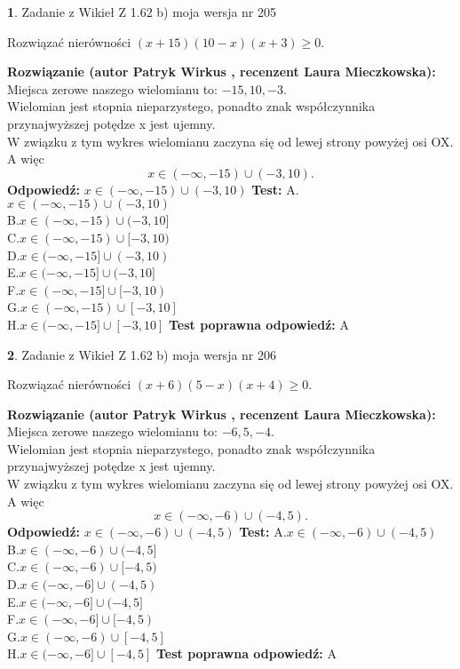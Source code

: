 \documentclass[12pt, a4paper]{article}
\theoremstyle{definition} %
\newtheorem{zad}{}
\newcommand{\zadStart}[1]{\begin{zad}#1\newline}
\newcommand{\zadStop}{\end{zad}}
\newcommand{\rozwStart}[2]{\noindent \textbf{Rozwiązanie (autor #1 , recenzent #2): }\newline}
\newcommand{\rozwStop}{\newline}
\newcommand{\odpStart}{\noindent \textbf{Odpowiedź:}\newline}
\newcommand{\odpStop}{\newline}
\newcommand{\testStart}{\noindent \textbf{Test:}\newline}
\newcommand{\testStop}{\newline}
\newcommand{\kluczStart}{\noindent \textbf{Test poprawna odpowiedź:}\newline}
\newcommand{\kluczStop}{\newline}
\begin{document}
\zadStart{Zadanie z Wikieł Z 1.62 b) moja wersja nr 205}

Rozwiązać nierówności $(x+15)(10-x)(x+3)\ge0$.
\zadStop
\rozwStart{Patryk Wirkus}{Laura Mieczkowska}
Miejsca zerowe naszego wielomianu to: $-15, 10, -3$.\\
Wielomian jest stopnia nieparzystego, ponadto znak współczynnika przy\linebreak najwyższej potędze x jest ujemny.\\ W związku z tym wykres wielomianu zaczyna się od lewej strony powyżej osi OX. A więc $$x \in (-\infty,-15) \cup (-3,10).$$
\rozwStop
\odpStart
$x \in (-\infty,-15) \cup (-3,10)$
\odpStop
\testStart
A.$x \in (-\infty,-15) \cup (-3,10)$\\
B.$x \in (-\infty,-15) \cup (-3,10]$\\
C.$x \in (-\infty,-15) \cup [-3,10)$\\
D.$x \in (-\infty,-15] \cup (-3,10)$\\
E.$x \in (-\infty,-15] \cup (-3,10]$\\
F.$x \in (-\infty,-15] \cup [-3,10)$\\
G.$x \in (-\infty,-15) \cup [-3,10]$\\
H.$x \in (-\infty,-15] \cup [-3,10]$
\testStop
\kluczStart
A
\kluczStop



\zadStart{Zadanie z Wikieł Z 1.62 b) moja wersja nr 206}

Rozwiązać nierówności $(x+6)(5-x)(x+4)\ge0$.
\zadStop
\rozwStart{Patryk Wirkus}{Laura Mieczkowska}
Miejsca zerowe naszego wielomianu to: $-6, 5, -4$.\\
Wielomian jest stopnia nieparzystego, ponadto znak współczynnika przy\linebreak najwyższej potędze x jest ujemny.\\ W związku z tym wykres wielomianu zaczyna się od lewej strony powyżej osi OX. A więc $$x \in (-\infty,-6) \cup (-4,5).$$
\rozwStop
\odpStart
$x \in (-\infty,-6) \cup (-4,5)$
\odpStop
\testStart
A.$x \in (-\infty,-6) \cup (-4,5)$\\
B.$x \in (-\infty,-6) \cup (-4,5]$\\
C.$x \in (-\infty,-6) \cup [-4,5)$\\
D.$x \in (-\infty,-6] \cup (-4,5)$\\
E.$x \in (-\infty,-6] \cup (-4,5]$\\
F.$x \in (-\infty,-6] \cup [-4,5)$\\
G.$x \in (-\infty,-6) \cup [-4,5]$\\
H.$x \in (-\infty,-6] \cup [-4,5]$
\testStop
\kluczStart
A
\kluczStop
\end{document}
